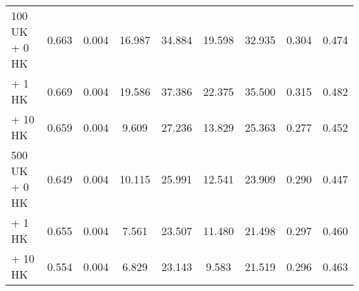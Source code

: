\begin{table*}[!ht]
\begin{tabular}{l|cc|cccccc}
\hspace{1.1ex} 100 UK\hspace{0.5ex} + \hspace{3.5ex} 0 HK     & 0.663                                & 0.004                                & 16.987                         & 34.884                            & 19.598                               & 32.935                               & 0.304                                & 0.474                             \\
\hspace{9.3ex} + \hspace{3.5ex} 1 HK    & 0.669                                 & 0.004                                & 19.586                            & 37.386                               & 22.375                               & 35.500                               & 0.315                                & 0.482                                \\
 \hspace{9.3ex} + \hspace{2.5ex} 10 HK   & 0.659                                 & 0.004                                & 9.609                             & 27.236                               & 13.829                               & 25.363                               & 0.277                                & 0.452                                \\
\hspace{1.1ex} 500 UK\hspace{0.5ex} + \hspace{3.5ex} 0 HK      &   0.649                                    &                            0.004          &     10.115                              &      25.991                                &      12.541                                &                          23.909            &  0.290                                    &    0.447                                  \\
\hspace{9.3ex} + \hspace{3.5ex} 1 HK     & 0.655                                 & 0.004                                & 7.561                             & 23.507                               & 11.480                               & 21.498                               & 0.297                                & 0.460                                \\
 \hspace{9.3ex} + \hspace{2.5ex} 10 HK  & 0.554                                 & 0.004                                & 6.829                             & 23.143                               & 9.583                                & 21.519                               & 0.296                                & 0.463                                \\

\end{tabular}
\end{table*}
